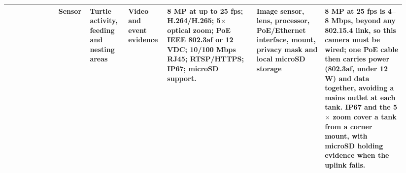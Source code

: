 \begin{longtable}{|P{0.12\linewidth}|P{0.065\linewidth}|P{0.095\linewidth}|P{0.095\linewidth}|P{0.21\linewidth}|P{0.16\linewidth}|P{0.19\linewidth}|}
\hline
{} & Sensor & Turtle activity, feeding and nesting areas & Video and event evidence & 8 MP at up to 25 fps; H.264/H.265; 5$\times$ optical zoom; PoE IEEE 802.3af or 12 VDC; 10/100 Mbps RJ45; RTSP/HTTPS; IP67; microSD support. \parencite{Reolink811A} & Image sensor, lens, processor, PoE/Ethernet interface, mount, privacy mask and local microSD storage & 8 MP at 25 fps is 4--8 Mbps, beyond any 802.15.4 link, so this camera must be wired; one PoE cable then carries power (802.3af, under 12 W) and data together, avoiding a mains outlet at each tank. IP67 and the 5$\times$ zoom cover a tank from a corner mount, with microSD holding evidence when the uplink fails.\\
\hline
\end{longtable}
